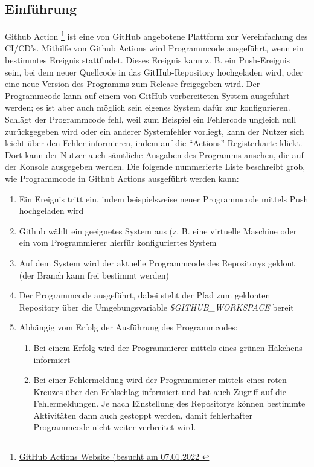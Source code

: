 \subsection{Einführung}
Github Action \footnote{\href{https://github.com/features/actions}{GitHub Actions Website (besucht am 07.01.2022 }} ist eine von GitHub angebotene Plattform zur Vereinfachung des \ac{CI/CD}'s. Mithilfe von  Github Actions wird Programmcode ausgeführt, wenn ein bestimmtes Ereignis stattfindet. Dieses Ereignis kann z. B. ein Push-Ereignis sein, bei dem neuer Quellcode in das GitHub-Repository hochgeladen wird, oder eine neue Version des Programms zum Release freigegeben wird. Der Programmcode kann auf einem von GitHub vorbereiteten System ausgeführt werden; es ist aber auch möglich sein eigenes System dafür zur konfigurieren. Schlägt der Programmcode fehl, weil zum Beispiel ein Fehlercode ungleich null zurückgegeben wird oder ein anderer Systemfehler vorliegt, kann der Nutzer sich leicht über den Fehler informieren, indem auf die \enquote{Actions}-Registerkarte klickt. Dort kann der Nutzer auch sämtliche Ausgaben des Programms ansehen, die auf der Konsole ausgegeben werden. Die folgende nummerierte Liste beschreibt grob, wie Programmcode in Github Actions ausgeführt werden kann:
\begin{enumerate}
    \item Ein Ereignis tritt ein, indem beispielsweise neuer Programmcode mittels Push hochgeladen wird 
    \item Github wählt ein geeignetes System aus (z. B. eine virtuelle Maschine oder ein vom Programmierer hierfür konfiguriertes System
    \item Auf dem System wird der aktuelle Programmcode des Repositorys geklont (der Branch kann frei bestimmt werden) 
    \item Der Programmcode ausgeführt, dabei steht der Pfad zum geklonten Repository über die Umgebungsvariable \textit{\$GITHUB\_WORKSPACE} bereit
    \item Abhängig vom Erfolg der Ausführung des Programmcodes:
    \begin{enumerate}
        \item Bei einem Erfolg wird der Programmierer mittels eines grünen Häkchens informiert
        \item Bei einer Fehlermeldung wird der Programmierer mittels eines roten Kreuzes über den Fehlschlag informiert und hat auch Zugriff auf die Fehlermeldungen. Je nach Einstellung des Repositorys können bestimmte Aktivitäten dann auch gestoppt werden, damit fehlerhafter Programmcode nicht weiter verbreitet wird. 
    \end{enumerate}
\end{enumerate}

